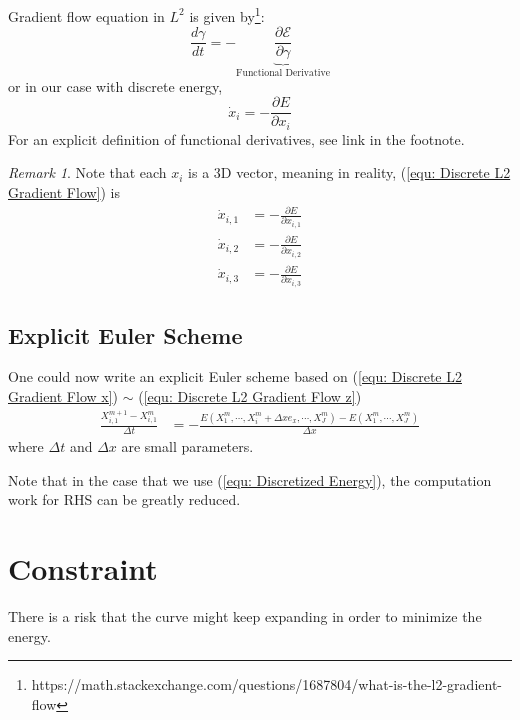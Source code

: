 \documentclass[a4paper, 11pt]{article}
\theoremstyle{definition}
\theoremstyle{remark}
\newtheorem{remark}{Remark}
\begin{document}
Gradient flow equation in $L^2$ is given by\footnote{
    https://math.stackexchange.com/questions/1687804/what-is-the-l2-gradient-flow
}:
\begin{equation}
    \frac{d \gamma}{dt} = - \underbrace{\frac{\partial \mathcal{E}}{\partial \gamma}}_{\text{Functional Derivative}}
\end{equation}
or in our case with discrete energy,
\begin{equation}
    \dot{x}_i = - \frac{\partial E}{\partial x_i}
    \label{equ: Discrete L2 Gradient Flow}
\end{equation}
For an explicit definition of functional derivatives, see link in the footnote.

\begin{remark}
    Note that each $x_i$ is a 3D vector,
    meaning in reality, (\ref{equ: Discrete L2 Gradient Flow}) is
    \begin{align}
        \dot{x}_{i, 1} &= -\frac{\partial E}{\partial x_{i, 1}}
        \label{equ: Discrete L2 Gradient Flow x}
        \\
        \dot{x}_{i, 2} &= -\frac{\partial E}{\partial x_{i, 2}} 
        \label{equ: Discrete L2 Gradient Flow y}
        \\
        \dot{x}_{i, 3} &= -\frac{\partial E}{\partial x_{i, 3}}
        \label{equ: Discrete L2 Gradient Flow z}
    \end{align}
\end{remark}

\subsection{Explicit Euler Scheme}
One could now write an explicit Euler scheme based on (\ref{equ: Discrete L2 Gradient Flow x}) $\sim$ (\ref{equ: Discrete L2 Gradient Flow z})
\begin{align}
    \frac{X_{i,1}^{m+1} - X_{i,1}^{m}}{\Delta t} &=  - \frac{E\left( X_1^{m}, \cdots, X_i^m + \Delta x e_x, \cdots, X_J^m \right) - E\left( X_1^{m}, \cdots, X_J^m \right)}{\Delta x}
    \label{equ: Discrete L2 Gradient Flow x Explicit Scheme}
\end{align}
where $\Delta t$ and $\Delta x$ are small parameters.

Note that in the case that we use (\ref{equ: Discretized Energy}),
the computation work for RHS can be greatly reduced.

\section{Constraint}
There is a risk that the curve might keep expanding in order to minimize the energy.
\end{document}

